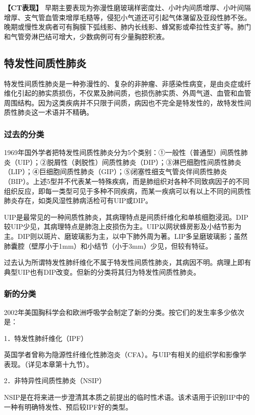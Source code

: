 \textbf{【CT表现】}
早期主要表现为弥漫性磨玻璃样密度灶、小叶内间质增厚、小叶间隔增厚、支气管血管束增厚毛糙等，侵犯小气道还可引起气体潴留及亚段性肺不张。晚期或慢性发病者可有胸膜下弧线影、肺内长线影、蜂窝影或牵拉性支扩等。肺门和气管旁淋巴结可增大，少数病例可有少量胸腔积液。

\subsection{特发性间质性肺炎}

特发性间质性肺炎是一种弥漫性的、复杂的非肿瘤、非感染性病变，是由炎症或纤维化引起的肺实质损伤，不仅累及肺间质，也损伤肺实质、外周气道、血管和血管周围结构。因为这类疾病并不只限于间质，病因也不完全是特发性的，故特发性间质性肺炎这一术语并不精确。

\subsubsection{过去的分类}

1969年国外学者把特发性间质性肺炎分为5个类别：①一般性（普通型）间质性肺炎（UIP）；②脱屑性（剥脱性）间质性肺炎（DIP）；③淋巴细胞性间质性肺炎（LIP）；④巨细胞间质性肺炎（GIP）；⑤闭塞性细支气管炎伴间质性肺炎（BIP）。上述5型并不代表某一特殊疾病，而是肺组织对各种不同致病因子的不同组织反应，即每一类型可见于多种不同疾病，而某一疾病可以有以上不同的间质性肺炎存在，如类风湿性肺病活检可有UIP或DIP。

UIP是最常见的一种间质性肺炎，其病理特点是间质纤维化和单核细胞浸润。DIP较UIP少见，其病理特点是肺泡上皮损伤为主。UIP以网状蜂房影及小结节影为主。DIP则以斑片、磨玻璃影为主，以中下肺外周为著。LIP多呈磨玻璃影；虽然肺囊腔（壁厚小于1mm）和小结节（小于3mm）少见，但较有特征。

过去认为所谓特发性肺纤维化不属于特发性间质性肺炎，其病因不明。病理上即有典型UIP也有DIP改变。但新的分类将其归为特发性间质性肺炎。

\subsubsection{新的分类}

2002年美国胸科学会和欧洲呼吸学会制定了新的分类。按它们的发生率多少依次是：

1．特发性肺纤维化（IPF）

英国学者曾称为隐源性纤维化性肺泡炎（CFA）。与UIP有相关的组织学和影像学表现。（详见本章第十九节）。

2．非特异性间质性肺炎（NSIP）

NSIP是在将来进一步澄清其本质之前提出的临时性术语。该术语用于识别IIP中的一种有明确特发性、预后较IPF好的类型。

